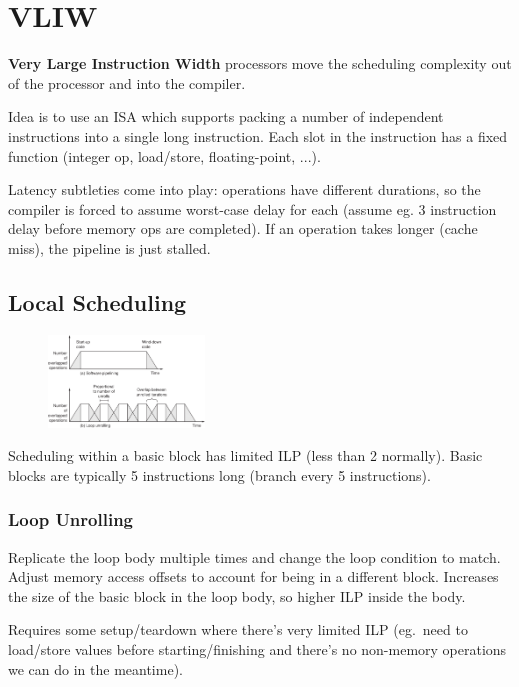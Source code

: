 \documentclass[a4paper,11pt]{article}
\begin{document}
\section*{VLIW}
{
    \textbf{Very Large Instruction Width} processors move the scheduling complexity out of the processor and into the compiler.

    Idea is to use an ISA which supports packing a number of independent instructions into a single long instruction. Each slot in the instruction has a fixed function (integer op, load/store, floating-point, ...).

    Latency subtleties come into play: operations have different durations, so the compiler is forced to assume worst-case delay for each (assume eg. 3 instruction delay before memory ops are completed). If an operation takes longer (cache miss), the pipeline is just stalled.

    \subsection*{Local Scheduling}
    {
        \begin{figure}
        \centering
        \includegraphics[width=0.37\textwidth]{software-pipelining.png}
        \end{figure}

        Scheduling within a basic block has limited ILP (less than 2 normally). Basic blocks are typically 5 instructions long (branch every 5 instructions).

        \subsubsection*{Loop Unrolling}
        {
            Replicate the loop body multiple times and change the loop condition to match. Adjust memory access offsets to account for being in a different block. Increases the size of the basic block in the loop body, so higher ILP inside the body.

            Requires some setup/teardown where there's very limited ILP (eg.\ need to load/store values before starting/finishing and there's no non-memory operations we can do in the meantime).
        }
}}
\end{document}
